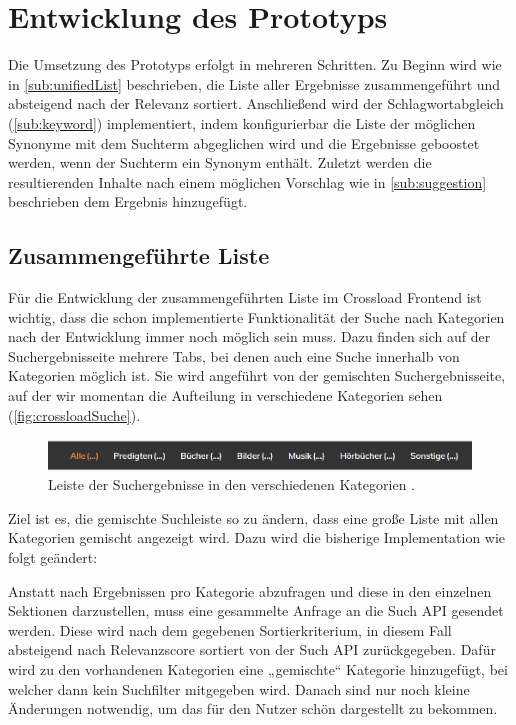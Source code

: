 \chapter{Entwicklung des Prototyps}
\label{ch:development}

Die Umsetzung des Prototyps erfolgt in mehreren Schritten. Zu Beginn wird wie in \ref{sub:unifiedList} beschrieben, die Liste aller Ergebnisse zusammengeführt und absteigend nach der Relevanz sortiert. Anschließend wird der Schlagwortabgleich (\ref{sub:keyword}) implementiert, indem konfigurierbar die Liste der möglichen Synonyme mit dem Suchterm abgeglichen wird und die Ergebnisse geboostet werden, wenn der Suchterm ein Synonym enthält. Zuletzt werden die resultierenden Inhalte nach einem möglichen Vorschlag wie in \ref{sub:suggestion} beschrieben dem Ergebnis hinzugefügt.

\section{Zusammengeführte Liste}
\label{sec:devUnifiedList}

Für die Entwicklung der zusammengeführten Liste im Crossload Frontend ist wichtig, dass die schon implementierte Funktionalität der Suche nach Kategorien nach der Entwicklung immer noch möglich sein muss.
Dazu finden sich auf der Suchergebnisseite mehrere Tabs, bei denen auch eine Suche innerhalb von Kategorien möglich ist.
Sie wird angeführt von der gemischten Suchergebnisseite, auf der wir momentan die Aufteilung in verschiedene Kategorien sehen (\ref{fig:crossloadSuche}).

\begin{figure}[h]
  \begin{centering}
    \includegraphics[width=\textwidth]{figures/development/kategorienLeiste.png}
    \caption{Leiste der Suchergebnisse in den verschiedenen Kategorien  \cite{pfleiderer2022}.}
    \label{fig:kategorienLeiste}
  \end{centering}
\end{figure}

Ziel ist es, die gemischte Suchleiste so zu ändern, dass eine große Liste mit allen Kategorien gemischt angezeigt wird.
Dazu wird die bisherige Implementation wie folgt geändert:

Anstatt nach Ergebnissen pro Kategorie abzufragen und diese in den einzelnen Sektionen darzustellen, muss eine gesammelte Anfrage an die Such API gesendet werden.
Diese wird nach dem gegebenen Sortierkriterium, in diesem Fall absteigend nach Relevanzscore sortiert von der Such API zurückgegeben.
Dafür wird zu den vorhandenen Kategorien eine „gemischte“ Kategorie hinzugefügt, bei welcher dann kein Suchfilter mitgegeben wird.
Danach sind nur noch kleine Änderungen notwendig, um das für den Nutzer schön dargestellt zu bekommen.

